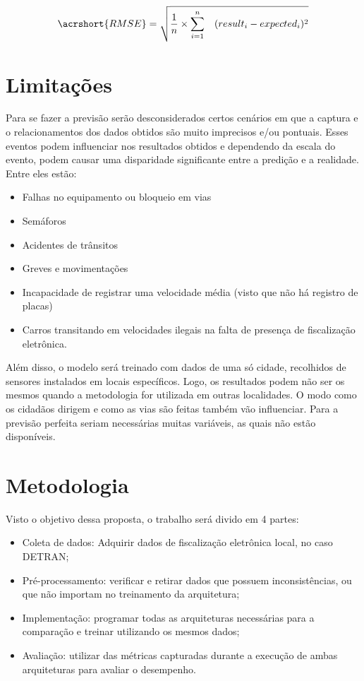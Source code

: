 \begin{equation}
\acrshort{RMSE} = \sqrt{ \frac{1}{n} \times \sum_{i=1}^{n} \quad (result_i - expected_i) ^ 2}
\end{equation}
    
\section{Limitações}
Para se fazer a previsão serão desconsiderados certos cenários em que a captura e o relacionamentos dos dados obtidos são muito imprecisos e/ou pontuais. Esses eventos podem influenciar nos resultados obtidos e dependendo da escala do evento, podem causar uma disparidade significante entre a predição e a realidade. Entre eles estão:
\begin{itemize}
    \item Falhas no equipamento ou bloqueio em vias
    \item Semáforos
    \item Acidentes de trânsitos
    \item Greves e movimentações
    \item Incapacidade de registrar uma velocidade média (visto que não há registro de placas)
    \item Carros transitando em velocidades ilegais na falta de presença de fiscalização eletrônica.
\end{itemize}
Além disso, o modelo será treinado com dados de uma só cidade, recolhidos de sensores instalados em locais específicos. Logo, os resultados podem não ser os mesmos quando a metodologia for utilizada em outras localidades. O modo como os cidadãos dirigem e como as vias são feitas também vão influenciar. Para a previsão perfeita seriam necessárias muitas variáveis, as quais não estão disponíveis.

\section{Metodologia}
Visto o objetivo dessa proposta, o trabalho será divido em 4 partes:

\begin{itemize}
    \item Coleta de dados: Adquirir dados de fiscalização eletrônica local, no caso \acrshort{DETRAN};
    \item Pré-processamento: verificar e retirar dados que possuem inconsistências, ou que não importam no treinamento da arquitetura;
    \item Implementação: programar todas as arquiteturas necessárias para a comparação e treinar utilizando os mesmos dados;
    \item Avaliação: utilizar das métricas capturadas durante a execução de ambas arquiteturas para avaliar o desempenho.
\end{itemize}

